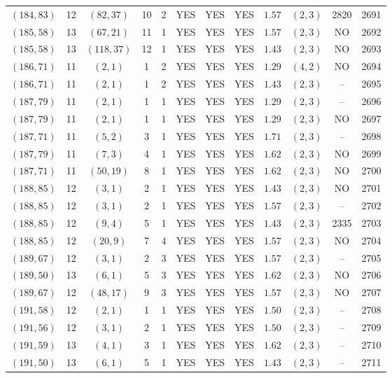 \begin{longtable}{|c|c|c|c|c|c|c|c|c|c|c|c|}
$(184,83)$ & 12 & $(82,37)$ & 10 & 2 & YES & YES & YES & $1.57$ & $(2,3)$ & 2820 & 2691\\
$(185,58)$ & 13 & $(67,21)$ & 11 & 1 & YES & YES & YES & $1.57$ & $(2,3)$ & NO & 2692\\
$(185,58)$ & 13 & $(118,37)$ & 12 & 1 & YES & YES & YES & $1.43$ & $(2,3)$ & NO & 2693\\
$(186,71)$ & 11 & $(2,1)$ & 1 & 2 & YES & YES & YES & $1.29$ & $(4,2)$ & NO & 2694\\
$(186,71)$ & 11 & $(2,1)$ & 1 & 2 & YES & YES & YES & $1.43$ & $(2,3)$ & -- & 2695\\
$(187,79)$ & 11 & $(2,1)$ & 1 & 1 & YES & YES & YES & $1.29$ & $(2,3)$ & -- & 2696\\
$(187,79)$ & 11 & $(2,1)$ & 1 & 1 & YES & YES & YES & $1.29$ & $(2,3)$ & NO & 2697\\
$(187,71)$ & 11 & $(5,2)$ & 3 & 1 & YES & YES & YES & $1.71$ & $(2,3)$ & -- & 2698\\
$(187,79)$ & 11 & $(7,3)$ & 4 & 1 & YES & YES & YES & $1.62$ & $(2,3)$ & NO & 2699\\
$(187,71)$ & 11 & $(50,19)$ & 8 & 1 & YES & YES & YES & $1.62$ & $(2,3)$ & NO & 2700\\
$(188,85)$ & 12 & $(3,1)$ & 2 & 1 & YES & YES & YES & $1.43$ & $(2,3)$ & NO & 2701\\
$(188,85)$ & 12 & $(3,1)$ & 2 & 1 & YES & YES & YES & $1.57$ & $(2,3)$ & -- & 2702\\
$(188,85)$ & 12 & $(9,4)$ & 5 & 1 & YES & YES & YES & $1.43$ & $(2,3)$ & 2335 & 2703\\
$(188,85)$ & 12 & $(20,9)$ & 7 & 4 & YES & YES & YES & $1.57$ & $(2,3)$ & NO & 2704\\
$(189,67)$ & 12 & $(3,1)$ & 2 & 3 & YES & YES & YES & $1.57$ & $(2,3)$ & -- & 2705\\
$(189,50)$ & 13 & $(6,1)$ & 5 & 3 & YES & YES & YES & $1.62$ & $(2,3)$ & NO & 2706\\
$(189,67)$ & 12 & $(48,17)$ & 9 & 3 & YES & YES & YES & $1.57$ & $(2,3)$ & NO & 2707\\
$(191,58)$ & 12 & $(2,1)$ & 1 & 1 & YES & YES & YES & $1.50$ & $(2,3)$ & -- & 2708\\
$(191,56)$ & 12 & $(3,1)$ & 2 & 1 & YES & YES & YES & $1.50$ & $(2,3)$ & -- & 2709\\
$(191,59)$ & 13 & $(4,1)$ & 3 & 1 & YES & YES & YES & $1.62$ & $(2,3)$ & -- & 2710\\
$(191,50)$ & 13 & $(6,1)$ & 5 & 1 & YES & YES & YES & $1.43$ & $(2,3)$ & -- & 2711\\

\end{longtable}
